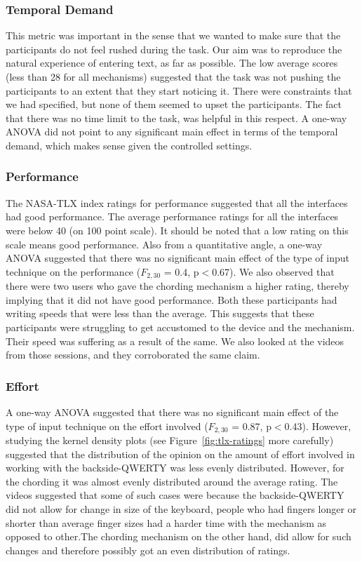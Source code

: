 \subsubsection{Temporal Demand}

This metric was important in the sense that we wanted to make sure that the participants do not feel rushed during the task. Our aim was to reproduce the natural experience of entering text, as far as possible. The low average scores (less than 28 for all mechanisms) suggested that the task was not pushing the participants to an extent that they start noticing it. There were constraints that we had specified, but none of them seemed to upset the participants. The fact
that there was no time limit to the task, was helpful in this respect. A one-way ANOVA did not point to any significant main effect in terms of the temporal demand, which makes sense given the controlled settings.

\subsubsection{Performance}

The NASA-TLX index ratings for performance suggested that all the interfaces had good performance. The average performance ratings for all the interfaces were below 40 (on 100 point scale). It should be noted that a low rating on this scale means good performance. Also from a quantitative angle, a one-way ANOVA suggested that there was no significant main effect of the type of input technique on the performance ($F_{2,30}$ = 0.4, p$<$0.67). We also observed that there were two users who gave the chording mechanism a higher rating, thereby implying that it did not have good performance. Both these participants had writing speeds that were less than the average. This suggests that these participants were struggling to get accustomed to the device and the mechanism. Their speed was suffering as a result of the same. We also looked at the videos from those sessions, and they corroborated the same claim. 

\subsubsection{Effort}

A one-way ANOVA suggested that there was no significant main effect of the type of input technique on the effort involved ($F_{2,30}$ = 0.87, p$<$0.43). However, studying the kernel density plots (see Figure~\ref{fig:tlx-ratings} more carefully) suggested that the distribution of the opinion on the amount of effort involved in working with the backside-QWERTY was less evenly distributed. However, for the chording it was almost evenly distributed around the average rating. The videos suggested that some of such cases were because the backside-QWERTY did not allow for change in size of the keyboard, people who had fingers longer or shorter than average finger sizes had a harder time with the mechanism as opposed to other.The chording mechanism on the other hand, did allow for such changes and therefore possibly got an even distribution of ratings.

